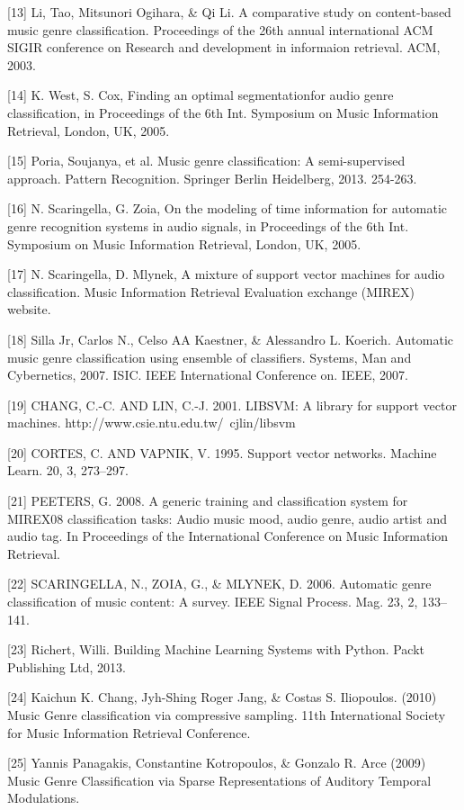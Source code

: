 \documentclass{article} %
\begin{document}
{[13] Li, Tao, Mitsunori Ogihara, \& Qi Li. A comparative study on content-based music genre classification. Proceedings of the 26th annual international ACM SIGIR conference on Research and development in informaion retrieval. ACM, 2003.

[14] K. West, S. Cox, Finding an optimal segmentationfor audio genre classification, in Proceedings of the 6th Int. Symposium on Music Information Retrieval, London, UK, 2005.

[15] Poria, Soujanya, et al. Music genre classification: A semi-supervised approach. Pattern Recognition. Springer Berlin Heidelberg, 2013. 254-263.

[16] N. Scaringella, G. Zoia, On the modeling of time information for automatic genre recognition systems in audio signals, in Proceedings of the 6th Int. Symposium on Music Information Retrieval, London, UK, 2005.

[17] N. Scaringella, D. Mlynek, A mixture of support vector machines for audio classification. Music Information Retrieval Evaluation exchange (MIREX) website.

[18] Silla Jr, Carlos N., Celso AA Kaestner, \& Alessandro L. Koerich. Automatic music genre classification using ensemble of classifiers. Systems, Man and Cybernetics, 2007. ISIC. IEEE International Conference on. IEEE, 2007.

[19] CHANG, C.-C. AND LIN, C.-J. 2001. LIBSVM: A library for support vector machines.
http://www.csie.ntu.edu.tw/~cjlin/libsvm

[20] CORTES, C. AND VAPNIK, V. 1995. Support vector networks. Machine Learn. 20, 3, 273–297.

[21] PEETERS, G. 2008. A generic training and classification system for MIREX08 classification tasks: Audio music mood, audio genre, audio artist and audio tag. In Proceedings of the International Conference on Music Information Retrieval.

[22] SCARINGELLA, N., ZOIA, G., \& MLYNEK, D. 2006. Automatic genre classification of music content: A survey. IEEE Signal Process. Mag. 23, 2, 133–141.

[23] Richert, Willi. Building Machine Learning Systems with Python. Packt Publishing Ltd, 2013.

[24] Kaichun K. Chang, Jyh-Shing Roger Jang, \& Costas S. Iliopoulos. (2010) Music Genre classification via compressive sampling. 11th International Society for Music Information Retrieval Conference.

[25] Yannis Panagakis, Constantine Kotropoulos, \& Gonzalo R. Arce (2009) Music Genre Classification via Sparse Representations of Auditory Temporal Modulations.

}
\end{document}
